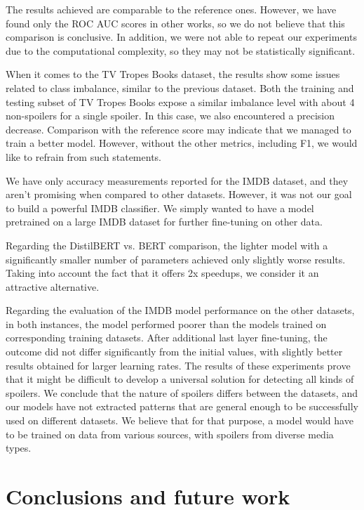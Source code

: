 \documentclass[11pt]{article}
\begin{document}
The results achieved are comparable to the reference ones. However, we have found only the ROC AUC scores in other works, so we do not believe that this comparison is conclusive. In addition, we were not able to repeat our experiments due to the computational complexity, so they may not be statistically significant.

When it comes to the TV Tropes Books dataset, the results show some issues related to class imbalance, similar to the previous dataset. Both the training and testing subset of TV Tropes Books expose a similar imbalance level with about 4 non-spoilers for a single spoiler. In this case, we also encountered a precision decrease. Comparison with the reference score may indicate that we managed to train a better model. However, without the other metrics, including F1, we would like to refrain from such statements.

We have only accuracy measurements reported for the IMDB dataset, and they aren't promising when compared to other datasets. However, it was not our goal to build a powerful IMDB classifier. We simply wanted to have a model pretrained on a large IMDB dataset for further fine-tuning on other data.


Regarding the DistilBERT vs. BERT comparison, the lighter model with a significantly smaller number of parameters achieved only slightly worse results. Taking into account the fact that it offers 2x speedups, we consider it an attractive alternative.

Regarding the evaluation of the IMDB model performance on the other datasets, in both instances, the model performed poorer than the models trained on corresponding training datasets.
After additional last layer fine-tuning, the outcome did not differ significantly from the initial values, with slightly better results obtained for larger learning rates.
The results of these experiments prove that it might be difficult to develop a universal solution for detecting all kinds of spoilers. We conclude that the nature of spoilers differs between the datasets, and our models have not extracted patterns that are general enough to be successfully used on different datasets. We believe that for that purpose, a model would have to be trained on data from various sources, with spoilers from diverse media types.


\section{Conclusions and future work} \label{conclusions}
\end{document}
